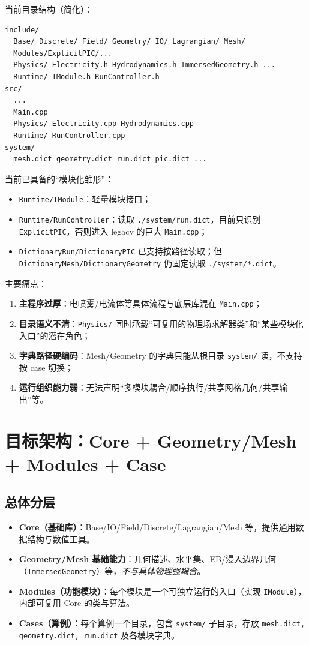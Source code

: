 \documentclass[UTF8,a4paper,11pt]{ctexart}
\begin{document}
当前目录结构（简化）：
\begin{lstlisting}
include/
  Base/ Discrete/ Field/ Geometry/ IO/ Lagrangian/ Mesh/
  Modules/ExplicitPIC/...
  Physics/ Electricity.h Hydrodynamics.h ImmersedGeometry.h ...
  Runtime/ IModule.h RunController.h
src/
  ...
  Main.cpp
  Physics/ Electricity.cpp Hydrodynamics.cpp
  Runtime/ RunController.cpp
system/
  mesh.dict geometry.dict run.dict pic.dict ...
\end{lstlisting}

当前已具备的“模块化雏形”：
\begin{itemize}
  \item \texttt{Runtime/IModule}：轻量模块接口；
  \item \texttt{Runtime/RunController}：读取 \texttt{./system/run.dict}，目前只识别 \texttt{ExplicitPIC}，否则进入 legacy 的巨大 \texttt{Main.cpp}；
  \item \texttt{DictionaryRun/DictionaryPIC} 已支持按路径读取；但 \texttt{DictionaryMesh/DictionaryGeometry} 仍固定读取 \texttt{./system/*.dict}。
\end{itemize}

主要痛点：
\begin{enumerate}[label=\arabic*)]
  \item \textbf{主程序过厚}：电喷雾/电流体等具体流程与底层库混在 \texttt{Main.cpp}；
  \item \textbf{目录语义不清}：\texttt{Physics/} 同时承载“可复用的物理场求解器类”和“某些模块化入口”的潜在角色；
  \item \textbf{字典路径硬编码}：Mesh/Geometry 的字典只能从根目录 \texttt{system/} 读，不支持按 case 切换；
  \item \textbf{运行组织能力弱}：无法声明“多模块耦合/顺序执行/共享网格几何/共享输出”等。
\end{enumerate}

\section{目标架构：Core + Geometry/Mesh + Modules + Case}

\subsection{总体分层}
\begin{itemize}
  \item \textbf{Core（基础库）}：Base/IO/Field/Discrete/Lagrangian/Mesh 等，提供通用数据结构与数值工具。
  \item \textbf{Geometry/Mesh 基础能力}：几何描述、水平集、EB/浸入边界几何（\texttt{ImmersedGeometry}）等，\emph{不与具体物理强耦合}。
  \item \textbf{Modules（功能模块）}：每个模块是一个可独立运行的入口（实现 \texttt{IModule}），内部可复用 Core 的类与算法。
  \item \textbf{Cases（算例）}：每个算例一个目录，包含 \texttt{system/} 子目录，存放 \texttt{mesh.dict, geometry.dict, run.dict} 及各模块字典。
\end{itemize}
\end{document}
